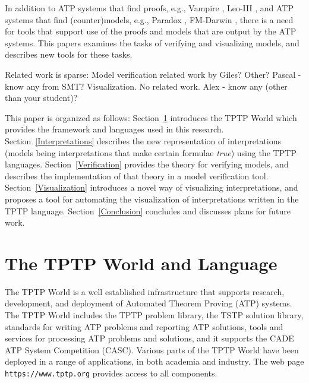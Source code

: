 \documentclass[letterpaper]{article}
\begin{document}
In addition to ATP systems that find proofs, e.g., Vampire \cite{KV13}, Leo-III \cite{SB18},
and ATP systems that find (counter)models, e.g., Paradox \cite{CS03}, FM-Darwin \cite{BF+09},
there is a need for tools that support use of the proofs and models that are output by the 
ATP systems.
This papers examines the tasks of verifying and visualizing models, and describes new tools for
these tasks.

Related work is sparse:
Model verification related work by Giles? Other? Pascal - know any from SMT?
Visualization.
No related work. Alex - know any (other than your student)?

This paper is organized as follows:
Section~\ref{TPTP} introduces the TPTP World which provides the framework and languages used
in this research.
Section~\ref{Interpretations} describes the new representation of interpretations (models being
interpretations that make certain formulae {\em true}) using the TPTP languages.
Section~\ref{Verification} provides the theory for verifying models, and describes the
implementation of that theory in a model verification tool.
Section~\ref{Visualization} introduces a novel way of visualizing interpretations, and
proposes a tool for automating the visualization of interpretations written in the TPTP language.
Section~\ref{Conclusion} concludes and discusses plans for future work.

\section{The TPTP World and Language}
\label{TPTP}

The TPTP World \cite{Sut17} is a well established infrastructure that supports research, 
development, and deployment of Automated Theorem Proving (ATP) systems.
The TPTP World includes the TPTP problem library,
the TSTP solution library,
standards for writing ATP problems and reporting ATP solutions,
tools and services for processing ATP problems and solutions,
and it supports the CADE ATP System Competition (CASC).
Various parts of the TPTP World have been deployed in a range of applications,
in both academia and industry.
The web page {\tt https://www.tptp.org} provides access to all 
components.
\end{document}
